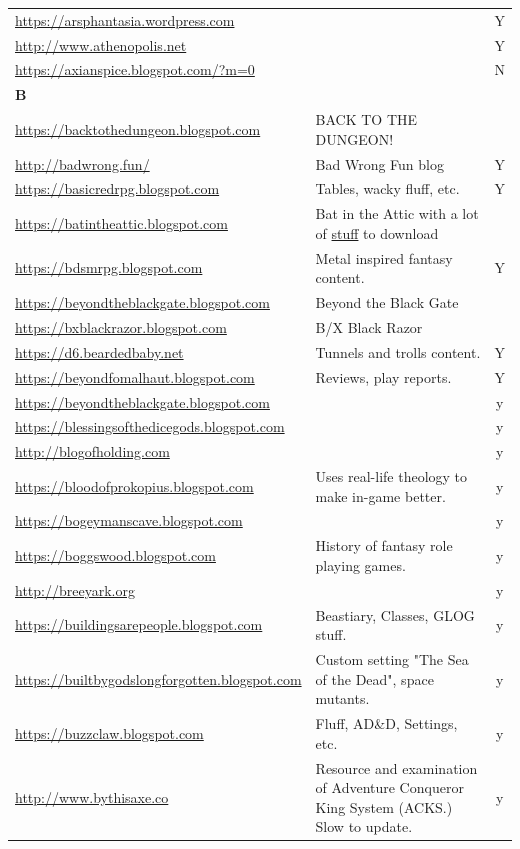 \documentclass[a4paper, 11pt, twoside]{article}
\begin{document}
\begin{longtable}{p{6cm}p{8cm}c}
\url{https://arsphantasia.wordpress.com} &  & Y\\
\url{http://www.athenopolis.net} &  & Y\\
\url{https://axianspice.blogspot.com/?m=0} &  & N\\
\textbf{B} &  & \\
\url{https://backtothedungeon.blogspot.com} & BACK TO THE DUNGEON! & \\
\url{http://badwrong.fun/} & Bad Wrong Fun blog & Y\\
\url{https://basicredrpg.blogspot.com} & Tables, wacky fluff, etc. & Y\\
\url{https://batintheattic.blogspot.com} & Bat in the Attic with a lot of \href{https://batintheattic.blogspot.com/p/stuff-in-attic.html}{stuff} to download & \\
\url{https://bdsmrpg.blogspot.com} & Metal inspired fantasy content. & Y\\
\url{https://beyondtheblackgate.blogspot.com} & Beyond the Black Gate & \\
\url{https://bxblackrazor.blogspot.com} & B/X Black Razor & \\
\url{https://d6.beardedbaby.net} & Tunnels and trolls content. & Y\\
\url{https://beyondfomalhaut.blogspot.com} & Reviews, play reports. & Y\\
\url{https://beyondtheblackgate.blogspot.com} &  & y\\
\url{https://blessingsofthedicegods.blogspot.com} &  & y\\
\url{http://blogofholding.com} &  & y\\
\url{https://bloodofprokopius.blogspot.com} & Uses real-life theology to make in-game better. & y\\
\url{https://bogeymanscave.blogspot.com} &  & y\\
\url{https://boggswood.blogspot.com} & History of fantasy role playing games. & y\\
\url{http://breeyark.org} &  & y\\
\url{https://buildingsarepeople.blogspot.com} & Beastiary, Classes, GLOG stuff. & y\\
\url{https://builtbygodslongforgotten.blogspot.com} & Custom setting "The Sea of the Dead", space mutants. & y\\
\url{https://buzzclaw.blogspot.com} & Fluff, AD\&D, Settings, etc. & y\\
\url{http://www.bythisaxe.co} & Resource and examination of Adventure Conqueror King System (ACKS.) Slow to update. & y\\

\end{longtable}
\end{document}
